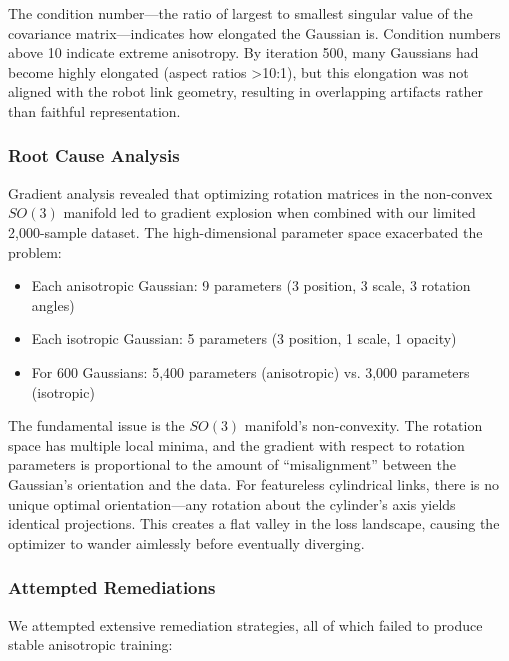 \documentclass[12pt,a4paper,oneside]{report}
\begin{document}
The condition number—the ratio of largest to smallest singular value of the covariance matrix—indicates how elongated the Gaussian is. Condition numbers above 10 indicate extreme anisotropy. By iteration 500, many Gaussians had become highly elongated (aspect ratios >10:1), but this elongation was not aligned with the robot link geometry, resulting in overlapping artifacts rather than faithful representation.

\subsubsection{Root Cause Analysis}
\label{subsubsec:root_cause_analysis}

Gradient analysis revealed that optimizing rotation matrices in the non-convex $SO(3)$ manifold led to gradient explosion when combined with our limited 2,000-sample dataset. The high-dimensional parameter space exacerbated the problem:

\begin{itemize}
    \item Each anisotropic Gaussian: 9 parameters (3 position, 3 scale, 3 rotation angles)
    \item Each isotropic Gaussian: 5 parameters (3 position, 1 scale, 1 opacity)
    \item For 600 Gaussians: 5,400 parameters (anisotropic) vs. 3,000 parameters (isotropic)
\end{itemize}

The fundamental issue is the $SO(3)$ manifold's non-convexity. The rotation space has multiple local minima, and the gradient with respect to rotation parameters is proportional to the amount of ``misalignment'' between the Gaussian's orientation and the data. For featureless cylindrical links, there is no unique optimal orientation—any rotation about the cylinder's axis yields identical projections. This creates a flat valley in the loss landscape, causing the optimizer to wander aimlessly before eventually diverging.

\subsubsection{Attempted Remediations}
\label{subsubsec:attempted_remediations}

We attempted extensive remediation strategies, all of which failed to produce stable anisotropic training:
\end{document}
